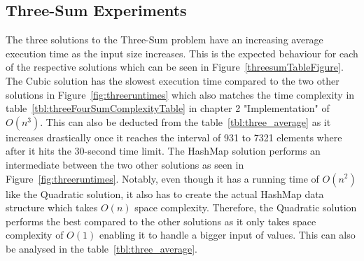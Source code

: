 \documentclass[12pt, a4paper]{article}
\begin{document}
\subsection{Three-Sum Experiments}
The three solutions to the Three-Sum problem have an increasing average execution time as the input size increases. This is the expected behaviour for each of the respective solutions which can be seen in Figure~\ref{threesumTableFigure}. The Cubic solution has the slowest execution time compared to the two other solutions in Figure~\ref{fig:threeruntimes} which also matches the time complexity in  table~\ref{tbl:threeFourSumComplexityTable} in chapter 2 "Implementation" of \(O(n^3)\). This can also be deducted from the table~\ref{tbl:three_average} as it increases drastically once it reaches the interval of 931 to 7321 elements where after it hits the 30-second time limit. The HashMap solution performs an intermediate between the two other solutions as seen in Figure~\ref{fig:threeruntimes}. Notably, even though it has a running time of \(O(n^2)\) like the Quadratic solution, it also has to create the actual HashMap data structure which takes \(O(n)\) space complexity. Therefore, the Quadratic solution performs the best compared to the other solutions as it only takes space complexity of \(O(1)\) enabling it to handle a bigger input of values. This can also be analysed in the table~\ref{tbl:three_average}.
\end{document}
